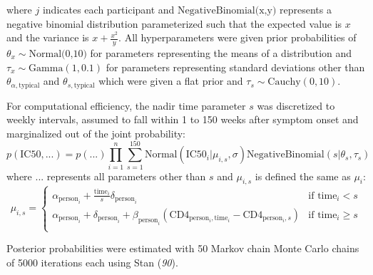 \documentclass[12pt]{article}
\newcommand{\stanRef}{\textit{90}}
\begin{document}
where $j$ indicates each participant and $\text{NegativeBinomial(x,y)}$ represents a negative binomial distribution parameterized such that the expected value is $x$ and the variance is $x+\frac{x^2}{y}$. All hyperparameters were given prior probabilities of $\theta_x \sim \text{Normal(0,10)}$ for parameters representing the means of a distribution and $\tau_x \sim \text{Gamma}(1,0.1)$ for parameters representing standard deviations other than $\theta_{\alpha,\text{typical}}$ and $\theta_{s,\text{typical}}$ which were given a flat prior and $\tau_s \sim \text{Cauchy}(0,10)$.

For computational efficiency, the nadir time parameter $s$ was discretized to weekly intervals, assumed to fall within 1 to 150 weeks after symptom onset and marginalized out of the joint probability:
\[p(\text{IC50},\text{...})=p(\text{...})\prod_{i=1}^n\sum_{s=1}^{150}\text{Normal}(\text{IC50}_i|\mu_{i,s},\sigma)\text{NegativeBinomial}(s|\theta_s,\tau_s)\]
where $\text{...}$ represents all parameters other than $s$ and $\mu_{i,s}$ is defined the same as $\mu_i$:
\[\mu_{i,s}=\begin{cases}
    \alpha_{\text{person}_i}+\frac{\text{time}_i}{s}\delta_{\text{person}_i} & \text{if } \text{time}_i<s\\
    \alpha_{\text{person}_i}+\delta_{\text{person}_i} + \beta_{\text{person}_i}(\text{CD4}_{\text{person$_i$},\text{time}_i}-\text{CD4}_{\text{person$_i$},s}) & \text{if } \text{time}_i\ge s\\
  \end{cases}
\]

Posterior probabilities were estimated with 50 Markov chain Monte Carlo chains of 5000 iterations each using Stan (\stanRef{}).
\end{document}
